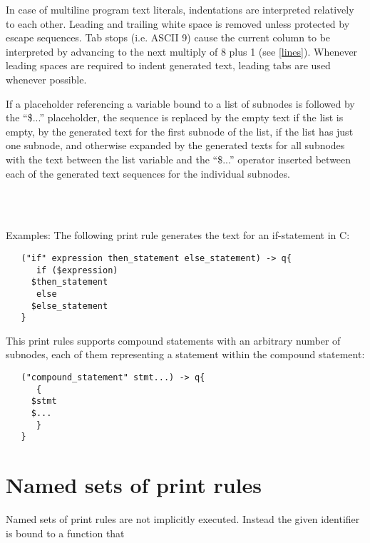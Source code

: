 In case of multiline program text literals, indentations are interpreted
relatively to each other. Leading and trailing white space is removed
unless protected by escape sequences. Tab stops
(i.e. ASCII 9) cause the current column to be interpreted by advancing
to the next multiply of 8 plus 1 (see \ref{lines}). Whenever
leading spaces are required to indent generated text, leading tabs
are used whenever possible.

If a placeholder referencing a variable bound to a list of 
subnodes is followed by the ``\$...'' placeholder, the
sequence is replaced by the empty text if the list is empty,
by the generated text for the first subnode of the list, if
the list has just one subnode, and otherwise expanded
by the generated texts for all subnodes with the text between
the list variable and the ``\$...'' operator inserted between
each of the generated text sequences for the individual subnodes.

\begin{grammar}
      \produces \lextoken{\$}  \\
      \produces \lextoken{\$}
	 \lextoken{\{}  \lextoken{\}} \\
      \produces {}
\end{grammar}

\noindent
Examples: The following print rule generates the text for an
if-statement in C:

\begin{lstlisting}
   ("if" expression then_statement else_statement) -> q{
      if ($expression)
	 $then_statement
      else
	 $else_statement
   }
\end{lstlisting}

\noindent
This print rules supports compound statements with an arbitrary
number of subnodes, each of them representing a statement within
the compound statement:

\begin{lstlisting}
   ("compound_statement" stmt...) -> q{
      {
	 $stmt
	 $...
      }
   }
\end{lstlisting}

\section{Named sets of print rules}\label{named-print}

Named sets of print rules are not implicitly executed. Instead the
given identifier is bound to a function that

